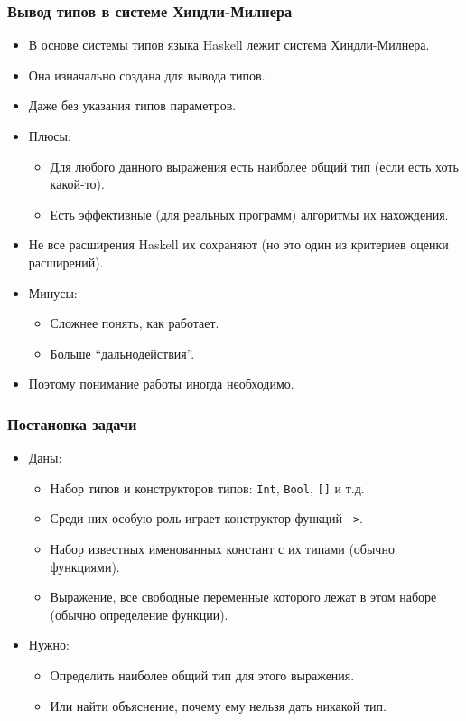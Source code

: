 \documentclass[11pt]{beamer}
\begin{document}
\begin{frame}[fragile]
\frametitle{Вывод типов в системе Хиндли-Милнера}
\begin{itemize}
    \item В основе системы типов языка Haskell лежит система Хиндли-Милнера.
    \item Она изначально создана для вывода типов.
    \pause
    \item Даже без указания типов параметров.
    \pause
    \item Плюсы: 
    \begin{itemize}
        \pause
        \item Для любого данного выражения есть наиболее общий тип (если есть хоть какой-то).
        \pause
        \item Есть эффективные (для реальных программ) алгоритмы их нахождения.
    \end{itemize}
    \pause
    \item Не все расширения Haskell их сохраняют (но это один из критериев оценки расширений).
    \pause
    \item Минусы:
    \begin{itemize}
        \pause
        \item Сложнее понять, как работает.
        \pause
        \item Больше \enquote{дальнодействия}.
    \end{itemize}
    \pause
    \item Поэтому понимание работы иногда необходимо.
\end{itemize}
\end{frame}

\begin{frame}[fragile]
\frametitle{Постановка задачи}
\begin{itemize}
    \item Даны:
    \begin{itemize}
        \item Набор типов и конструкторов типов: \lstinline|Int|, \lstinline|Bool|, \lstinline|[]| и т.д.
        \item Среди них особую роль играет конструктор функций \lstinline|->|.
        \item Набор известных именованных констант с их типами (обычно функциями).
        \item Выражение, все свободные переменные которого лежат в этом наборе (обычно определение функции).
    \end{itemize}
    \pause
    \item Нужно: 
    \begin{itemize}
        \item Определить наиболее общий тип для этого выражения.
        \pause
        \item Или найти объяснение, почему ему нельзя дать никакой тип.
    \end{itemize}
\end{itemize}
\end{frame}
\end{document}
